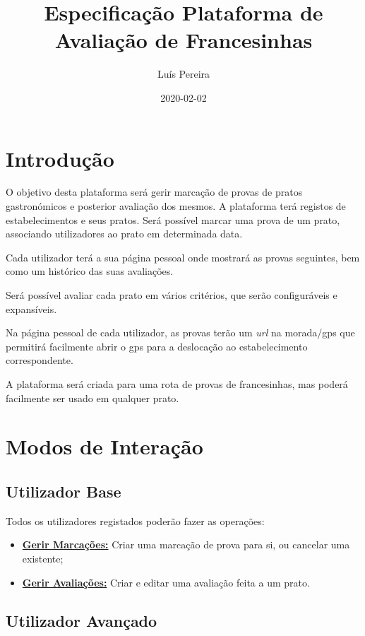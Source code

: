 \documentclass[11pt, a4paper, sans]{article}
\title{Especificação Plataforma de Avaliação de Francesinhas}
\date{2020-02-02}
\author{Luís Pereira}
\begin{document}
	\maketitle
	\newpage

	\section{Introdução}
	
	O objetivo desta plataforma será gerir marcação de provas de pratos gastronómicos e posterior
	avaliação dos mesmos. A plataforma terá registos de estabelecimentos e seus pratos. Será possível marcar
	uma prova de um prato, associando utilizadores ao prato em determinada data. 

	Cada utilizador terá a sua página pessoal onde mostrará as provas seguintes, bem como um histórico das 
	suas avaliações.

	Será possível avaliar cada prato em vários critérios, que serão configuráveis e expansíveis.

	Na página pessoal de cada utilizador, as provas terão um \textit{url} na morada/gps que permitirá 
	facilmente abrir o gps para a deslocação ao estabelecimento correspondente.

	A plataforma será criada para uma rota de provas de francesinhas, mas poderá facilmente ser 
	usado em qualquer prato.

	\section{Modos de Interação}

	\subsection{Utilizador Base}

	Todos os utilizadores registados poderão fazer as operações:

	\begin{itemize}
		\item \underline{\textbf{Gerir Marcações:}} Criar uma marcação de prova para si, ou cancelar uma existente;
		\item \underline{\textbf{Gerir Avaliações:}} Criar e editar uma avaliação feita a um prato.
	\end{itemize}

	\subsection{Utilizador Avançado}
\end{document}
